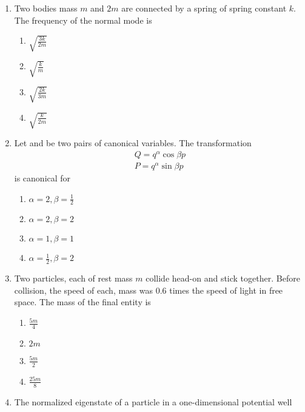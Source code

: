 \documentclass[journal]{IEEEtran}
\begin{document}
\begin{enumerate}
\begin{multicols}{4}
\end{multicols}
\item Two bodies mass $m$ and $2m$ are connected by a spring of spring constant $k$. The frequency of the normal mode is
\begin{multicols}{4}
    \begin{enumerate}
        \item $\sqrt{\frac{3k}{2m}}$
        \item $\sqrt{\frac{k}{m}}$
        \item $\sqrt{\frac{2k}{3m}}$
        \item $\sqrt{\frac{k}{2m}}$
    \end{enumerate}
\end{multicols}
\item Let  and  be two pairs of canonical variables. The transformation
\begin{align*}
    Q=q^{\alpha}\cos{\beta p}\\
    P=q^{\alpha}\sin{\beta p} 
\end{align*}
is canonical for
\begin{multicols}{4}
    \begin{enumerate}
        \item $\alpha =2, \beta =\frac{1}{2}$
        \item $\alpha =2, \beta =2$
        \item $\alpha =1, \beta =1$
        \item $\alpha =\frac{1}{2}, \beta =2$
    \end{enumerate}
\end{multicols}
\item Two particles, each of rest mass $m$ collide head-on and stick together. Before collision, the speed of each, mass was 0.6 times the speed of light in free space. The mass of the final entity is
\begin{multicols}{4}
    \begin{enumerate}
        \item $\frac{5m}{4}$
        \item $2m$
        \item $\frac{5m}{2}$
        \item $\frac{25m}{8}$
    \end{enumerate}
\end{multicols}
\item The normalized eigenstate of a particle in a one-dimensional potential well
\begin{align*}

\end{align*}
\end{enumerate}
\end{document}
